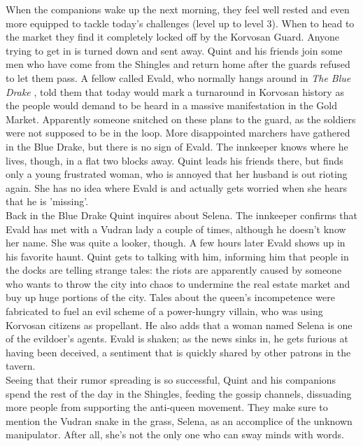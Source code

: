 When the companions wake up the next morning, they feel well rested and even more equipped to tackle today's challenges (level up to level 3). When to head to the market they find it completely locked off by the Korvosan Guard. Anyone trying to get in is turned down and sent away. Quint and his friends join some men who have come from the Shingles and return home after the guards refused to let them pass. A fellow called Evald, who normally hangs around in {\itshape The Blue Drake} , told them that today would mark a turnaround in Korvosan history as the people would demand to be heard in a massive manifestation in the Gold Market. Apparently someone snitched on these plans to the guard, as the soldiers were not supposed to be in the loop. More disappointed marchers have gathered in the Blue Drake, but there is no sign of Evald. The innkeeper knows where he lives, though, in a flat two blocks away. Quint leads his friends there, but finds only a young frustrated woman, who is annoyed that her husband is out rioting again. She has no idea where Evald is and actually gets worried when she hears that he is 'missing'.\\

Back in the Blue Drake Quint inquires about Selena. The innkeeper confirms that Evald has met with a Vudran lady a couple of times, although he doesn't know her name. She was quite a looker, though. A few hours later Evald shows up in his favorite haunt. Quint gets to talking with him, informing him that people in the docks are telling strange tales: the riots are apparently caused by someone who wants to throw the city into chaos to undermine the real estate market and buy up huge portions of the city. Tales about the queen's incompetence were fabricated to fuel an evil scheme of a power-hungry villain, who was using Korvosan citizens as propellant. He also adds that a woman named Selena is one of the evildoer's agents. Evald is shaken; as the news sinks in, he gets furious at having been deceived, a sentiment that is quickly shared by other patrons in the tavern.\\

Seeing that their rumor spreading is so successful, Quint and his companions spend the rest of the day in the Shingles, feeding the gossip channels, dissuading more people from supporting the anti-queen movement. They make sure to mention the Vudran snake in the grass, Selena, as an accomplice of the unknown manipulator. After all, she's not the only one who can sway minds with words.\\

